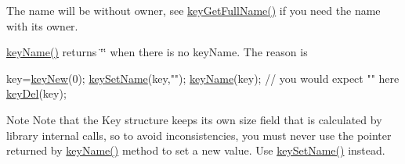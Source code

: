The name will be without owner, see \hyperlink{group__keyname_gaaba1494a5ffc976e0e56c43f4334a23c}{key\-Get\-Full\-Name()} if you need the name with its owner.

\hyperlink{group__keyname_ga8e805c726a60da921d3736cda7813513}{key\-Name()} returns \char`\"{}\char`\"{} when there is no key\-Name. The reason is 
\begin{DoxyCode}
key=\hyperlink{group__key_gad23c65b44bf48d773759e1f9a4d43b89}{keyNew}(0);
\hyperlink{group__keyname_ga7699091610e7f3f43d2949514a4b35d9}{keySetName}(key,\textcolor{stringliteral}{""});
\hyperlink{group__keyname_ga8e805c726a60da921d3736cda7813513}{keyName}(key); \textcolor{comment}{// you would expect "" here}
\hyperlink{group__key_ga3df95bbc2494e3e6703ece5639be5bb1}{keyDel}(key);
\end{DoxyCode}


\begin{DoxyNote}{Note}
Note that the Key structure keeps its own size field that is calculated by library internal calls, so to avoid inconsistencies, you must never use the pointer returned by \hyperlink{group__keyname_ga8e805c726a60da921d3736cda7813513}{key\-Name()} method to set a new value. Use \hyperlink{group__keyname_ga7699091610e7f3f43d2949514a4b35d9}{key\-Set\-Name()} instead.
\end{DoxyNote}

